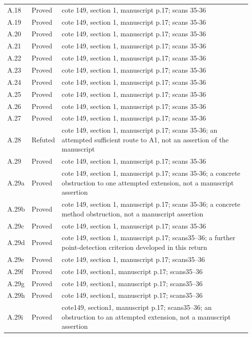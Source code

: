 {\begin{longtable}{p{1.9cm}p{1.7cm}p{10.3cm}}
A.18 & Proved & cote 149, section 1, manuscript p.17; scans 35-36 \\
A.19 & Proved & cote 149, section 1, manuscript p.17; scans 35-36 \\
A.20 & Proved & cote 149, section 1, manuscript p.17; scans 35-36 \\
A.21 & Proved & cote 149, section 1, manuscript p.17; scans 35-36 \\
A.22 & Proved & cote 149, section 1, manuscript p.17; scans 35-36 \\
A.23 & Proved & cote 149, section 1, manuscript p.17; scans 35-36 \\
A.24 & Proved & cote 149, section 1, manuscript p.17; scans 35-36 \\
A.25 & Proved & cote 149, section 1, manuscript p.17; scans 35-36 \\
A.26 & Proved & cote 149, section 1, manuscript p.17; scans 35-36 \\
A.27 & Proved & cote 149, section 1, manuscript p.17; scans 35-36 \\
A.28 & Refuted & cote 149, section 1, manuscript p.17; scans 35-36; an attempted sufficient route to A1, not an assertion of the manuscript \\
A.29 & Proved & cote 149, section 1, manuscript p.17; scans 35-36 \\
A.29a & Proved & cote 149, section 1, manuscript p.17; scans 35-36; a concrete obstruction to one attempted extension, not a manuscript assertion \\
A.29b & Proved & cote 149, section 1, manuscript p.17; scans 35-36; a concrete method obstruction, not a manuscript assertion \\
A.29c & Proved & cote 149, section 1, manuscript p.17; scans 35-36 \\
A.29d & Proved & cote 149, section 1, manuscript p.17; scans35–36; a further point-detection criterion developed in this return \\
A.29e & Proved & cote 149, section 1, manuscript p.17; scans35–36 \\
A.29f & Proved & cote 149, section1, manuscript p.17; scans35–36 \\
A.29g & Proved & cote 149, section1, manuscript p.17; scans35–36 \\
A.29h & Proved & cote 149, section1, manuscript p.17; scans35–36 \\
A.29i & Proved & cote149, section1, manuscript p.17; scans35–36; an obstruction to an attempted extension, not a manuscript assertion \\

\end{longtable}}
